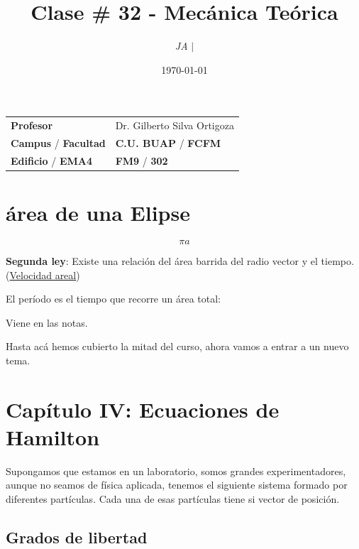 \documentclass{article}
\title{Clase \# 32 - Mecánica Teórica}
\author{\emph{JA} $\boldsymbol{\mid}$}
\date{\today}
\begin{document}
\maketitle



\begin{mybox}
\noindent\begin{tabular}{@{}ll}
	{\bfseries{Profesor}} & Dr. Gilberto Silva Ortigoza\\
	\textcolor{prussianblue}{\bfseries{Campus}} / \textcolor{trueblue}{\bfseries{Facultad}}  & \textcolor{prussianblue}{\bfseries{C.U. BUAP}} /  \textcolor{trueblue}{\bfseries{FCFM}} \\
	\textcolor{prussianblue}{\bfseries{Edificio}} /  \textcolor{trueblue}{\bfseries{EMA4}}    & 	\textcolor{prussianblue}{\bfseries{FM9}} /  \textcolor{trueblue}{\bfseries{302}}   
\end{tabular} 
\end{mybox} \vspace{1cm}

\tableofcontents

\vspace{2cm}

\section{área de una Elipse}

\[ \pi{a} \]

\textbf{Segunda ley}: Existe una relación del área barrida del radio vector y el tiempo. (\underline{Velocidad areal})

El período es el tiempo que recorre un área total:

Viene en las notas.

Hasta acá hemos cubierto la mitad del curso, ahora vamos a entrar a un nuevo tema.

\section{Capítulo IV: Ecuaciones de Hamilton}

Supongamos que estamos en un laboratorio, somos grandes experimentadores, aunque no seamos de física aplicada, tenemos el siguiente sistema formado por diferentes partículas. Cada una de esas partículas tiene si vector de posición.

\subsection{Grados de libertad}
\end{document}
